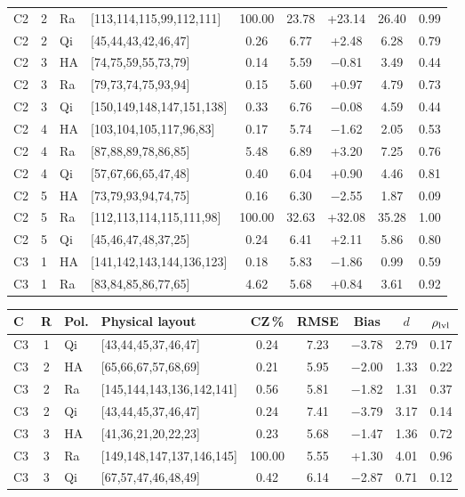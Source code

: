 \documentclass[journal]{IEEEtran}
\begin{document}
\begin{table}[t]
\begin{tabular}[t]{@{}lclp{2.75cm}ccccc@{}}
C2 & 2 & Ra & [113,114,115,99,112,111] & 100.00 & 23.78 & +23.14 & 26.40 & 0.99 \\
C2 & 2 & Qi & [45,44,43,42,46,47] & 0.26 & 6.77 & +2.48 & 6.28 & 0.79 \\
C2 & 3 & HA & [74,75,59,55,73,79] & 0.14 & 5.59 & $-$0.81 & 3.49 & 0.44 \\
C2 & 3 & Ra & [79,73,74,75,93,94] & 0.15 & 5.60 & +0.97 & 4.79 & 0.73 \\
C2 & 3 & Qi & [150,149,148,147,151,138] & 0.33 & 6.76 & $-$0.08 & 4.59 & 0.44 \\
C2 & 4 & HA & [103,104,105,117,96,83] & 0.17 & 5.74 & $-$1.62 & 2.05 & 0.53 \\
C2 & 4 & Ra & [87,88,89,78,86,85] & 5.48 & 6.89 & +3.20 & 7.25 & 0.76 \\
C2 & 4 & Qi & [57,67,66,65,47,48] & 0.40 & 6.04 & +0.90 & 4.46 & 0.81 \\
C2 & 5 & HA & [73,79,93,94,74,75] & 0.16 & 6.30 & $-$2.55 & 1.87 & 0.09 \\
C2 & 5 & Ra & [112,113,114,115,111,98] & 100.00 & 32.63 & +32.08 & 35.28 & 1.00 \\
C2 & 5 & Qi & [45,46,47,48,37,25] & 0.24 & 6.41 & +2.11 & 5.86 & 0.80 \\
C3 & 1 & HA & [141,142,143,144,136,123] & 0.18 & 5.83 & $-$1.86 & 0.99 & 0.59 \\
C3 & 1 & Ra & [83,84,85,86,77,65] & 4.62 & 5.68 & +0.84 & 3.61 & 0.92 \\
\bottomrule
\end{tabular}\hfill
\begin{tabular}[t]{@{}lclp{2.75cm}ccccc@{}}
\toprule
C & R & Pol. & Physical layout & CZ\,\% & RMSE & Bias & $d$ & $\rho_{\rm lvl}$ \\
\midrule
C3 & 1 & Qi & [43,44,45,37,46,47] & 0.24 & 7.23 & $-$3.78 & 2.79 & 0.17 \\
C3 & 2 & HA & [65,66,67,57,68,69] & 0.21 & 5.95 & $-$2.00 & 1.33 & 0.22 \\
C3 & 2 & Ra & [145,144,143,136,142,141] & 0.56 & 5.81 & $-$1.82 & 1.31 & 0.37 \\
C3 & 2 & Qi & [43,44,45,37,46,47] & 0.24 & 7.41 & $-$3.79 & 3.17 & 0.14 \\
C3 & 3 & HA & [41,36,21,20,22,23] & 0.23 & 5.68 & $-$1.47 & 1.36 & 0.72 \\
C3 & 3 & Ra & [149,148,147,137,146,145] & 100.00 & 5.55 & +1.30 & 4.01 & 0.96 \\
C3 & 3 & Qi & [67,57,47,46,48,49] & 0.42 & 6.14 & $-$2.87 & 0.71 & 0.12 \\

\end{tabular}
\end{table}
\end{document}
